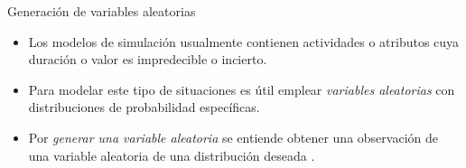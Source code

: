 
\begin{frame}{Generación de variables aleatorias}
    \begin{itemize}
        \item Los modelos de simulación usualmente contienen actividades o atributos cuya duración o valor es impredecible o incierto.
        \item Para modelar este tipo de situaciones es útil emplear \textit{variables aleatorias} con distribuciones de probabilidad específicas.
        \item Por \textit{generar una variable aleatoria} se entiende obtener una observación de una variable aleatoria de una distribución deseada \cite{LK}.
    \end{itemize}
\end{frame}

        
